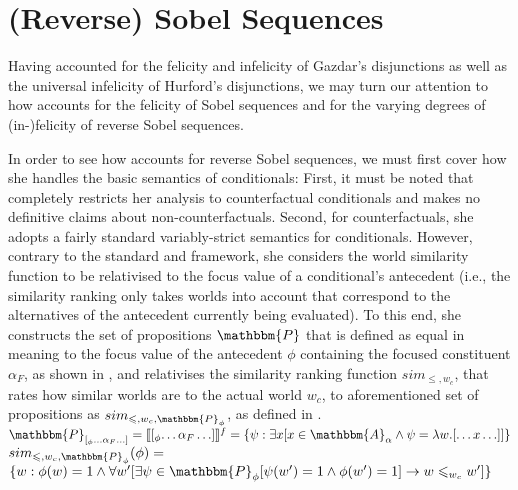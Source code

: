 \section{(Reverse) Sobel Sequences}
Having accounted for the felicity and infelicity of Gazdar's disjunctions as well as the universal infelicity of Hurford's disjunctions, we may turn our attention to how \textcite{Ippolito2020} accounts for the felicity of Sobel sequences and for the varying degrees of (in-)felicity of reverse Sobel sequences.

In order to see how \textcite{Ippolito2020} accounts for reverse Sobel sequences, we must first cover how she handles the basic semantics of conditionals: First, it must be noted that \textcite{Ippolito2020} completely restricts her analysis to counterfactual conditionals and makes no definitive claims about non-counterfactuals. Second, for counterfactuals, she adopts a fairly standard variably-strict semantics for conditionals.
\ex{}
\xe
However, contrary to the standard \textcite{Stalnaker1968} and \textcite{Lewis1973} framework, she considers the world similarity function to be relativised to the focus value of a conditional's antecedent (i.e., the similarity ranking only takes worlds into account that correspond to the alternatives of the antecedent currently being evaluated). To this end, she constructs the set of propositions $\mathbbm{P}$ that is defined as equal in meaning to the focus value of the antecedent $\phi$ containing the focused constituent $\alpha_F$, as shown in , and relativises the similarity ranking function $sim_{\leqslant,w_c}$, that rates how similar worlds are to the actual world $w_c$, to aforementioned set of propositions as $sim_{\leqslant,w_c,\mathbbm{P}_\phi}$, as defined in .
\pex[nopreamble=true]\label{def:ippolito-vs}%
\a{} $\mathbbm{P}_{[_\phi\ldots\alpha_F\ldots]}=\intension[f]{$[_\phi\ldots\alpha_F\ldots]$}=\{\psi:\exists{x}[x\in\mathbbm{A}_\alpha\land\psi=\lambda{w}.[\ldots{x}\ldots]]\}$
\a{} $sim_{\leqslant,w_c,\mathbbm{P}_\phi}(\phi)=\\$\emptyfill$\{w:\phi(w)=1\land\forall{w'}[\exists\psi\in\mathbbm{P}_\phi[\psi(w')=1\land\phi(w')=1]\rightarrow w\leqslant_{w_c}w']\}$
\xe
